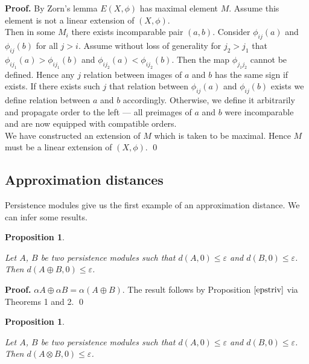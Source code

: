 \documentclass[a4paper, 12pt]{article}
\newcounter{stmcounter}[section]
\numberwithin{equation}{section}
\newtheorem{proposition}[stmcounter]{Proposition}
\theoremstyle{definition}
\theoremstyle{remark}
\newenvironment{pf}{\noindent\textbf{Proof.}}{\qed}
\renewcommand{\leq}{\leqslant}
\begin{document}
\begin{pf}
  By Zorn's lemma $E(X,\phi)$ has maximal element $M$. Assume this element is not a linear extension of $(X,\phi)$.\\

  Then in some $M_i$ there exists incomparable pair $(a,b)$. Consider $\phi_{ij}(a)$ and $\phi_{ij}(b)$ for all $j > i$. Assume without loss of generality for $j_2 > j_1$ that $\phi_{ij_1}(a) > \phi_{ij_1}(b)$ and $\phi_{ij_2}(a) < \phi_{ij_2}(b)$. Then the map $\phi_{j_1j_2}$ cannot be defined. Hence any $j$ relation between images of $a$ and $b$ has the same sign if exists. If there exists such $j$ that relation between $\phi_{ij}(a)$ and $\phi_{ij}(b)$ exists we define relation between $a$ and $b$ accordingly. Otherwise, we define it arbitrarily and propagate order to the left --- all preimages of $a$ and $b$ were incomparable and are now equipped with compatible orders.\\

  We have constructed an extension of $M$ which is taken to be maximal. Hence $M$ must be a linear extension of $(X,\phi)$.
\end{pf}

\subsection{Approximation distances}

Persistence modules give us the first example of an approximation distance. We can infer some results.\\

\begin{proposition} ~ \par
  \label{prop:sum}
  Let $A$, $B$ be two persistence modules such that $d(A,0) \leq \varepsilon$ and $d(B,0) \leq \varepsilon$. Then $d(A \oplus B,0) \leq \varepsilon$.
\end{proposition}

\begin{pf}
  $\alpha A \oplus \alpha B = \alpha(A \oplus B)$. The result follows by Proposition $\ref{epstriv}$ via Theorems 1 and 2.
\end{pf}

\begin{proposition} ~ \par
  \label{prop:tensor}
  Let $A$, $B$ be two persistence modules such that $d(A,0) \leq \varepsilon$ and $d(B,0) \leq \varepsilon$. Then $d(A \otimes B,0) \leq \varepsilon$.
\end{proposition}
\end{document}
